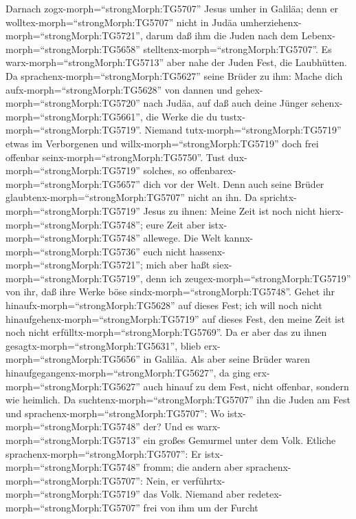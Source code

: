  Darnach zogx-morph=``strongMorph:TG5707'' Jesus umher in
Galiläa; denn er wolltex-morph=``strongMorph:TG5707'' nicht in Judäa
umherziehenx-morph=``strongMorph:TG5721'', darum daß ihm die Juden nach
dem Lebenx-morph=``strongMorph:TG5658''
stelltenx-morph=``strongMorph:TG5707''.  Es
warx-morph=``strongMorph:TG5713'' aber nahe der Juden Fest, die
Laubhütten.  Da sprachenx-morph=``strongMorph:TG5627'' seine
Brüder zu ihm: Mache dich aufx-morph=``strongMorph:TG5628'' von dannen
und gehex-morph=``strongMorph:TG5720'' nach Judäa, auf daß auch deine
Jünger sehenx-morph=``strongMorph:TG5661'', die Werke die du
tustx-morph=``strongMorph:TG5719''.  Niemand
tutx-morph=``strongMorph:TG5719'' etwas im Verborgenen und
willx-morph=``strongMorph:TG5719'' doch frei offenbar
seinx-morph=``strongMorph:TG5750''. Tust
dux-morph=``strongMorph:TG5719'' solches, so
offenbarex-morph=``strongMorph:TG5657'' dich vor der Welt. 
Denn auch seine Brüder glaubtenx-morph=``strongMorph:TG5707'' nicht an
ihn.  Da sprichtx-morph=``strongMorph:TG5719'' Jesus zu
ihnen: Meine Zeit ist noch nicht hierx-morph=``strongMorph:TG5748'';
eure Zeit aber istx-morph=``strongMorph:TG5748'' allewege. 
Die Welt kannx-morph=``strongMorph:TG5736'' euch nicht
hassenx-morph=``strongMorph:TG5721''; mich aber haßt
siex-morph=``strongMorph:TG5719'', denn ich
zeugex-morph=``strongMorph:TG5719'' von ihr, daß ihre Werke böse
sindx-morph=``strongMorph:TG5748''.  Gehet ihr
hinaufx-morph=``strongMorph:TG5628'' auf dieses Fest; ich will noch
nicht hinaufgehenx-morph=``strongMorph:TG5719'' auf dieses Fest, den
meine Zeit ist noch nicht erfülltx-morph=``strongMorph:TG5769''.
 Da er aber das zu ihnen
gesagtx-morph=``strongMorph:TG5631'', blieb
erx-morph=``strongMorph:TG5656'' in Galiläa.  Als aber
seine Brüder waren hinaufgegangenx-morph=``strongMorph:TG5627'', da ging
erx-morph=``strongMorph:TG5627'' auch hinauf zu dem Fest, nicht
offenbar, sondern wie heimlich.  Da
suchtenx-morph=``strongMorph:TG5707'' ihn die Juden am Fest und
sprachenx-morph=``strongMorph:TG5707'': Wo
istx-morph=``strongMorph:TG5748'' der?  Und es
warx-morph=``strongMorph:TG5713'' ein großes Gemurmel unter dem Volk.
Etliche sprachenx-morph=``strongMorph:TG5707'': Er
istx-morph=``strongMorph:TG5748'' fromm; die andern aber
sprachenx-morph=``strongMorph:TG5707'': Nein, er
verführtx-morph=``strongMorph:TG5719'' das Volk.  Niemand
aber redetex-morph=``strongMorph:TG5707'' frei von ihm um der Furcht
